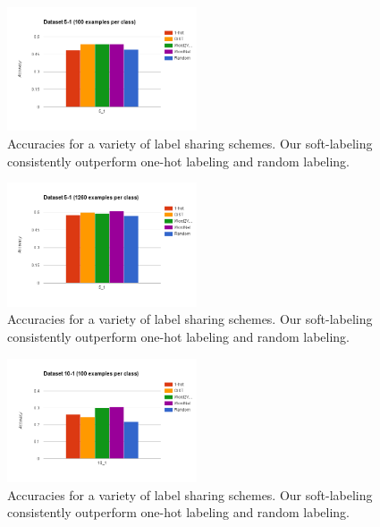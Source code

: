 \begin{figure}[!tb]
  \centering
  \includegraphics[width=0.5\textwidth]{figs/5_1-train_100.png}
  \caption{
      Accuracies for a variety of label sharing schemes. Our soft-labeling
      consistently outperform one-hot labeling and random labeling.
  }
  \label{fig:5_1-train_100}
\end{figure}

\begin{figure}[!tb]
  \centering
  \includegraphics[width=0.5\textwidth]{figs/5_1-train_1260.png}
  \caption{
      Accuracies for a variety of label sharing schemes. Our soft-labeling
      consistently outperform one-hot labeling and random labeling.
  }
  \label{fig:5_1-train_100}
\end{figure}

\begin{figure}[!tb]
  \centering
  \includegraphics[width=0.5\textwidth]{figs/10_1-train_100.png}
  \caption{
      Accuracies for a variety of label sharing schemes. Our soft-labeling
      consistently outperform one-hot labeling and random labeling.
  }
  \label{fig:10_1-train_100}
\end{figure}

